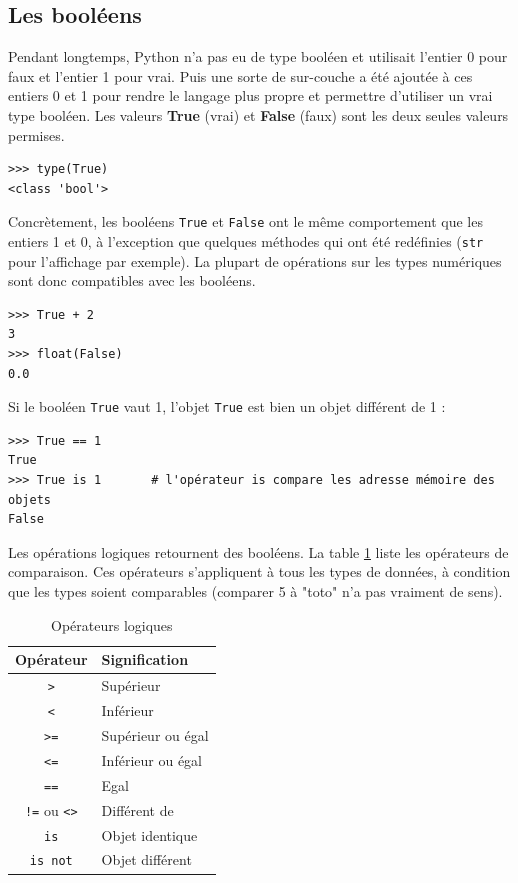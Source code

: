 \documentclass[12pt, a4paper]{article}
\begin{document}
\subsection{Les booléens}
Pendant longtemps, Python n'a pas eu de type booléen et utilisait l'entier 0 pour faux et l'entier 1 pour vrai. Puis une sorte de sur-couche a été ajoutée à ces entiers 0 et 1 pour rendre le langage plus propre et permettre d'utiliser un vrai type booléen. Les valeurs \textbf{True} (vrai) et \textbf{False} (faux) sont les deux seules valeurs permises.
\begin{lstlisting}
>>> type(True)
<class 'bool'>
\end{lstlisting}

Concrètement, les booléens \lstinline{True} et \lstinline{False} ont le même comportement que les entiers 1 et 0, à l'exception que quelques méthodes qui ont été redéfinies (\lstinline{str} pour l'affichage par exemple). La plupart de opérations sur les types numériques sont donc compatibles avec les booléens.
\begin{lstlisting}
>>> True + 2
3
>>> float(False)
0.0
\end{lstlisting}

Si le booléen \lstinline{True} vaut 1, l'objet \lstinline{True} est bien un objet différent de 1 :
\begin{lstlisting}
>>> True == 1
True
>>> True is 1		# l'opérateur is compare les adresse mémoire des objets
False
\end{lstlisting}

Les opérations logiques retournent des booléens. La table \ref{tab:operateurs_comparaison} liste les opérateurs de comparaison. Ces opérateurs s'appliquent à tous les types de données, à condition que les types soient comparables (comparer 5 à "toto" n'a pas vraiment de sens).

\begin{table}[H]
	\begin{center}
		\begin{tabular}{|c|l|}
			\hline
			\textbf{Opérateur} & \textbf{Signification} \\
			\hline
			\lstinline{>} & Supérieur \\
			\lstinline{<} & Inférieur\\
			\lstinline{>=} & Supérieur ou égal \\
			\lstinline{<=} & Inférieur ou égal \\
			\lstinline{==} & Egal \\
			\lstinline{!=} ou \lstinline{<>} & Différent de \\
			\lstinline{is} & Objet identique \\
			\lstinline{is not} & Objet différent \\
			\hline
		\end{tabular}
	\caption{Opérateurs logiques}
	\label{tab:operateurs_comparaison}
	\end{center}
\end{table}
\end{document}
